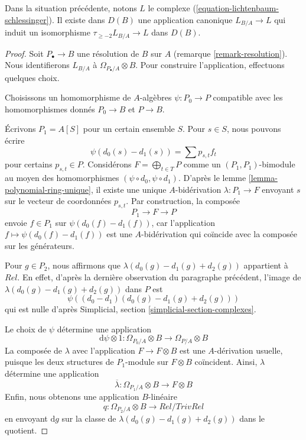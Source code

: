 \begin{lemma}
\label{lemma-compare-higher}
Dans la situation précédente, notons $L$ le complexe
(\ref{equation-lichtenbaum-schlessinger}). Il existe dans $D(B)$ une
application canonique $L_{B/A} \to L$ qui induit un isomorphisme
$\tau_{\geq -2}L_{B/A} \to L$ dans $D(B)$.
\end{lemma}

\begin{proof}
Soit $P_\bullet \to B$ une résolution de $B$ sur $A$ (remarque
\ref{remark-resolution}). Nous identifierons $L_{B/A}$ à
$\Omega_{P_\bullet/A} \otimes B$. Pour construire l'application, effectuons
quelques choix.

\medskip\noindent
Choisissons un homomorphisme de $A$-algèbres $\psi : P_0 \to P$ compatible
avec les homomorphismes donnés $P_0 \to B$ et $P \to B$.

\medskip\noindent
Écrivons $P_1 = A[S]$ pour un certain ensemble $S$. Pour $s \in S$, nous
pouvons écrire
$$
\psi(d_0(s) - d_1(s)) = \sum p_{s, t} f_t
$$
pour certains $p_{s, t} \in P$. Considérons
$F = \bigoplus_{t \in T} P$ comme un $(P_1, P_1)$-bimodule au moyen des
homomorphismes $(\psi \circ d_0, \psi \circ d_1)$. D'après le lemme
\ref{lemma-polynomial-ring-unique}, il existe une unique $A$-bidérivation
$\lambda : P_1 \to F$ envoyant $s$ sur le vecteur de coordonnées $p_{s, t}$.
Par construction, la composée
$$
P_1 \longrightarrow F \longrightarrow P
$$
envoie $f \in P_1$ sur $\psi(d_0(f) - d_1(f))$, car l'application
$f \mapsto \psi(d_0(f) - d_1(f))$ est une $A$-bidérivation qui coïncide avec la
composée sur les générateurs.

\medskip\noindent
Pour $g \in P_2$, nous affirmons que
$\lambda(d_0(g) - d_1(g) + d_2(g))$ appartient à $Rel$. En effet, d'après la
dernière observation du paragraphe précédent, l'image de
$\lambda(d_0(g) - d_1(g) + d_2(g))$ dans $P$ est
$$
\psi((d_0 - d_1)(d_0(g) - d_1(g) + d_2(g)))
$$
qui est nulle d'après Simplicial, section
\ref{simplicial-section-complexes}.

\medskip\noindent
Le choix de $\psi$ détermine une application
$$
\text{d}\psi \otimes 1 :
\Omega_{P_0/A} \otimes B
\longrightarrow
\Omega_{P/A} \otimes B
$$
La composée de $\lambda$ avec l'application $F \to F \otimes B$ est une
$A$-dérivation usuelle, puisque les deux structures de $P_1$-module sur
$F \otimes B$ coïncident. Ainsi, $\lambda$ détermine une application
$$
\overline{\lambda} :
\Omega_{P_1/A} \otimes B
\longrightarrow
F \otimes B
$$
Enfin, nous obtenons une application $B$-linéaire
$$
q :
\Omega_{P_2/A} \otimes B
\longrightarrow
Rel/TrivRel
$$
en envoyant $\text{d}g$ sur la classe de
$\lambda(d_0(g) - d_1(g) + d_2(g))$ dans le quotient.


\end{proof}

